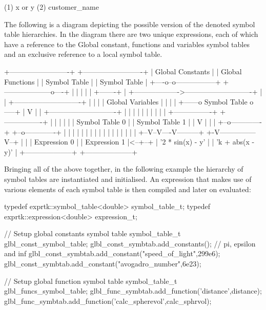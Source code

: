 (1) x or y
(2) customer\_name


The  following is  a  diagram  depicting the  possible version  of the
denoted symbol table hierarchies. In the diagram there are two  unique
expressions, each of  which have a  reference to the  Global constant,
functions and variables symbol tables and an exclusive reference to  a
local symbol table.

+-------------------------+    +-------------------------+
|     Global Constants    |    |     Global Functions    |
|       Symbol Table      |    |       Symbol Table      |
+----o--o-----------------+    +--------------------o----+
|  |                                           |
|  |                                           +-------+
|  +------------------->----------------------------+  |
|         +----------------------------+            |  |
|         |      Global Variables      |            |  |
|  +------o        Symbol Table        o-----+      |  V
|  |      +----------------------------+     |      |  |
|  |                                         |      |  |
|  | +----------------+   +----------------+ |      |  |
|  | | Symbol Table 0 |   | Symbol Table 1 | |      V  |
|  | +--o-------------+   +--o-------------+ |      |  |
|  |    |                    |               |      |  |
|  |    |                    |               |      |  |
+--V--V----V---------+        +-V---------------V--+   |  |
|    Expression 0    |        |    Expression 1    |<--+--+
|  '2 * sin(x) - y'  |        |  'k + abs(x - y)'  |
+--------------------+        +--------------------+


Bringing  all of  the above  together, in  the following  example the
hierarchy  of  symbol  tables  are instantiated  and  initialised. An
expression that makes use of various elements of each symbol table is
then compiled and later on evaluated:

typedef exprtk::symbol\_table<double> symbol\_table\_t;
typedef exprtk::expression<double>     expression\_t;

// Setup global constants symbol table
symbol\_table\_t glbl\_const\_symbol\_table;
glbl\_const\_symbtab.add\_constants(); // pi, epsilon and inf
glbl\_const\_symbtab.add\_constant("speed\_of\_light",299e6);
glbl\_const\_symbtab.add\_constant("avogadro\_number",6e23);

// Setup global function symbol table
symbol\_table\_t glbl\_funcs\_symbol\_table;
glbl\_func\_symbtab.add\_function('distance',distance);
glbl\_func\_symbtab.add\_function('calc\_spherevol',calc\_sphrvol);

